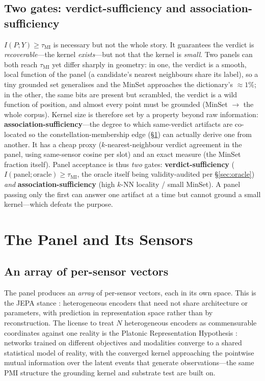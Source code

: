 \documentclass[10pt,twocolumn]{article}
\begin{document}
\subsection{Two gates: verdict-sufficiency and association-sufficiency}
\label{sec:twogate}
$I(P;Y)\ge\tau_{\mathrm{MI}}$ is necessary but not the whole story. It guarantees
the verdict is \emph{recoverable}---the kernel \emph{exists}---but not that the
kernel is \emph{small}. Two panels can both reach $\tau_{\mathrm{MI}}$ yet differ
sharply in geometry: in one, the verdict is a smooth, local function of the panel
(a candidate's nearest neighbours share its label), so a tiny grounded set
generalises and the MinSet approaches the dictionary's $\approx1\%$; in the other,
the same bits are present but scrambled, the verdict is a wild function of
position, and almost every point must be grounded (MinSet $\to$ the whole corpus).
Kernel size is therefore set by a property beyond raw information:
\textbf{association-sufficiency}---the degree to which same-verdict artifacts are
co-located so the constellation-membership edge (\S\ref{sec:panel}) can actually
derive one from another. It has a cheap proxy ($k$-nearest-neighbour verdict
agreement in the panel, using same-sensor cosine per slot) and an exact measure
(the MinSet fraction itself). Panel acceptance is thus \emph{two} gates:
\textbf{verdict-sufficiency} ($I(\text{panel};\text{oracle})\ge\tau_{\mathrm{MI}}$,
the oracle itself being validity-audited per \S\ref{sec:oracle}) \emph{and}
\textbf{association-sufficiency} (high $k$-NN locality / small MinSet). A panel
passing only the first can answer one artifact at a time but cannot ground a small
kernel---which defeats the purpose.

\section{The Panel and Its Sensors}
\label{sec:panel}

\subsection{An array of per-sensor vectors}
The panel produces an \emph{array} of per-sensor vectors, each in its own space.
This is the JEPA stance \citep{lecun2022path}: heterogeneous encoders that need
not share architecture or parameters, with prediction in representation space
rather than by reconstruction. The license to treat $N$ heterogeneous encoders as
commensurable coordinates against one reality is the Platonic Representation
Hypothesis \citep{huh2024platonic}: networks trained on different objectives and
modalities converge to a shared statistical model of reality, with the converged
kernel approaching the pointwise mutual information over the latent events that
generate observations---the same PMI structure the grounding kernel and substrate
test are built on.
\end{document}
